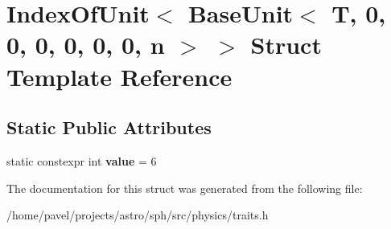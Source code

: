 \hypertarget{structIndexOfUnit_3_01BaseUnit_3_01T_00_010_00_010_00_010_00_010_00_010_00_010_00_01n_01_4_01_4}{}\section{Index\+Of\+Unit$<$ Base\+Unit$<$ T, 0, 0, 0, 0, 0, 0, n $>$ $>$ Struct Template Reference}
\label{structIndexOfUnit_3_01BaseUnit_3_01T_00_010_00_010_00_010_00_010_00_010_00_010_00_01n_01_4_01_4}
\subsection*{Static Public Attributes}
\begin{DoxyCompactItemize}
\item 
\hypertarget{structIndexOfUnit_3_01BaseUnit_3_01T_00_010_00_010_00_010_00_010_00_010_00_010_00_01n_01_4_01_4_aa922f067db2bb41683c76ef3bf263ff2}{}\label{structIndexOfUnit_3_01BaseUnit_3_01T_00_010_00_010_00_010_00_010_00_010_00_010_00_01n_01_4_01_4_aa922f067db2bb41683c76ef3bf263ff2} 
static constexpr int {\bfseries value} = 6
\end{DoxyCompactItemize}


The documentation for this struct was generated from the following file\+:\begin{DoxyCompactItemize}
\item 
/home/pavel/projects/astro/sph/src/physics/traits.\+h\end{DoxyCompactItemize}
